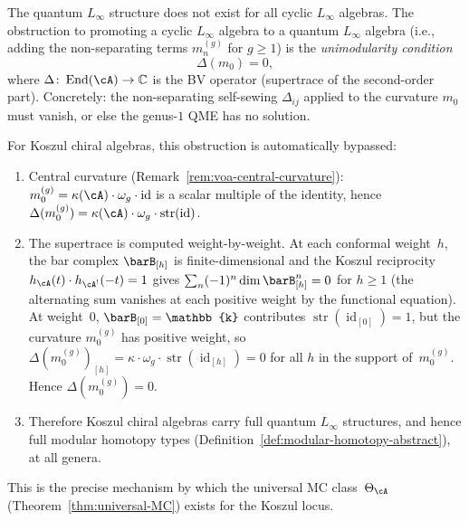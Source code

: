 \begin{remark}
\label{rem:unimodularity-obstruction}
The quantum $L_\infty$ structure does not exist for all cyclic
$L_\infty$ algebras.  The obstruction to promoting a cyclic
$L_\infty$ algebra to a quantum $L_\infty$ algebra (i.e., adding
the non-separating terms $m_n^{(g)}$ for $g \geq 1$) is the
\emph{unimodularity condition}
\begin{equation}\label{eq:unimodularity}
\Delta(m_0) = 0,
\end{equation}
where $\Delta\colon \operatorname{End}(\cA) \to \mathbb{C}$ is the
BV operator (supertrace of the second-order part).
Concretely: the non-separating self-sewing $\Delta_{ij}$ applied to
the curvature $m_0$ must vanish, or else the genus-$1$ QME has no
solution.

For Koszul chiral algebras, this obstruction is automatically
bypassed:
\begin{enumerate}[label=\textup{(\alph*)}]
\item Central curvature
  (Remark~\ref{rem:voa-central-curvature}):
  $m_0^{(g)} = \kappa(\cA) \cdot \omega_g \cdot \operatorname{id}$
  is a scalar multiple of the identity, hence
  $\Delta(m_0^{(g)}) = \kappa(\cA) \cdot \omega_g
  \cdot \operatorname{str}(\operatorname{id})$.
\item The supertrace is computed weight-by-weight.
  At each conformal weight~$h$, the bar complex
  $\barB_{[h]}$ is finite-dimensional and the Koszul
  reciprocity $h_{\cA}(t) \cdot h_{\cA^!}(-t) = 1$
  \cite[Theorem~3.5.1]{LV12} gives
  $\sum_n (-1)^n \dim \barB^n_{[h]} = 0$ for $h \geq 1$
  (the alternating sum vanishes at each positive weight by
  the functional equation).  At weight~$0$,
  $\barB_{[0]} = \mathbb{k}$ contributes
  $\operatorname{str}(\operatorname{id}_{[0]}) = 1$, but
  the curvature $m_0^{(g)}$ has positive weight, so
  $\Delta(m_0^{(g)})_{[h]} = \kappa \cdot \omega_g \cdot
  \operatorname{str}(\operatorname{id}_{[h]}) = 0$
  for all $h$ in the support of~$m_0^{(g)}$.
  Hence $\Delta(m_0^{(g)}) = 0$.
\item Therefore Koszul chiral algebras carry full quantum
  $L_\infty$ structures, and hence full modular homotopy types
  (Definition~\ref{def:modular-homotopy-abstract}), at all genera.
\end{enumerate}
This is the precise mechanism by which the universal MC
class~$\Theta_\cA$
(Theorem~\ref{thm:universal-MC}) exists for the Koszul locus.
\end{remark}


